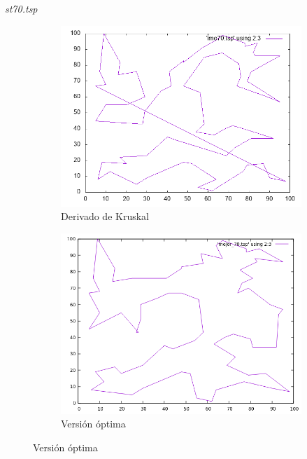 \documentclass{beamer}
\begin{document}
\begin{frame}[fragile]{\textit{st70.tsp}}
\begin{figure}[H]
\begin{subfigure}[b]{0.36\textwidth}
\includegraphics[width=\textwidth]{st70_ime.png}
\caption*{\small{Derivado de Kruskal}}
\end{subfigure}
\quad
\begin{subfigure}[b]{0.36\textwidth}
\includegraphics[width=\textwidth]{st70_mejor.png}
\caption*{\small{Versión óptima}}
\end{subfigure}
\end{figure}

\end{frame}	
\end{document}
